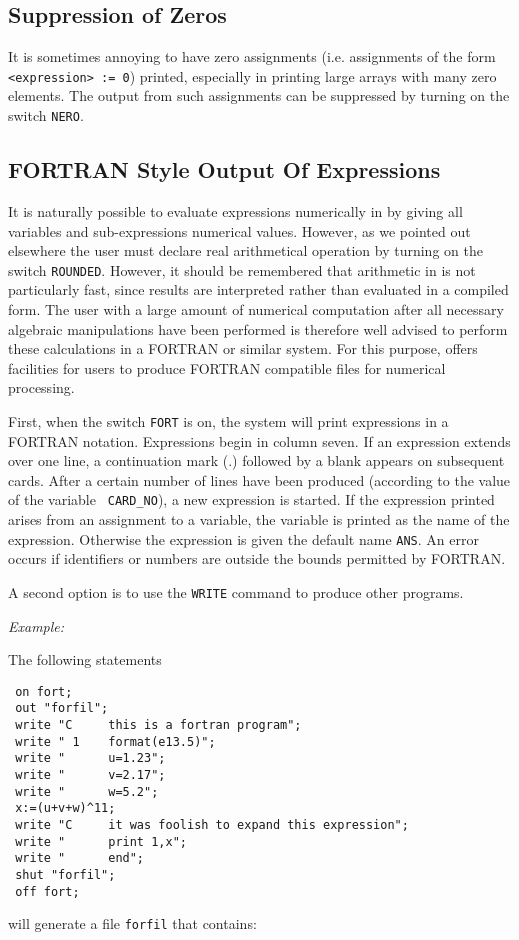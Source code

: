 \subsection{Suppression of Zeros}

It is sometimes annoying to have zero assignments (i.e. assignments of the
form {\tt <expression> := 0}) printed, especially in printing large arrays
with many zero elements.  The output from such assignments can be
suppressed by turning on the switch {\tt NERO}.

\subsection{{FORTRAN} Style Output Of Expressions}

It is naturally possible to evaluate expressions numerically in {\REDUCE} by
giving all variables and sub-expressions numerical values. However, as we
pointed out elsewhere the user must declare real arithmetical operation by
turning on the switch {\tt ROUNDED}.  However, it should be
remembered that arithmetic in {\REDUCE} is not particularly fast, since
results are interpreted rather than evaluated in a compiled form. The user
with a large amount of numerical computation after all necessary algebraic
manipulations have been performed is therefore well advised to perform
these calculations in a FORTRAN or similar system.  For
this purpose, {\REDUCE} offers facilities for users to produce FORTRAN
compatible files for numerical processing.

First, when the switch {\tt FORT} is on, the system will
print expressions in a FORTRAN notation.  Expressions begin in column
seven.  If an expression extends over one line, a continuation mark (.)
followed by a blank appears on subsequent cards.  After a certain number
of lines have been produced (according to the value of the variable {\tt
CARD\_NO}), a new expression is started.  If the
expression printed arises from an assignment to a variable, the variable
is printed as the name of the expression.  Otherwise the expression is
given the default name {\tt ANS}.  An error occurs if identifiers or
numbers are outside the bounds permitted by FORTRAN.

A second option is to use the {\tt WRITE} command to produce other programs.

{\it Example:}

The following {\REDUCE} statements
\begin{verbatim}
 on fort;
 out "forfil";
 write "C     this is a fortran program";
 write " 1    format(e13.5)";
 write "      u=1.23";
 write "      v=2.17";
 write "      w=5.2";
 x:=(u+v+w)^11;
 write "C     it was foolish to expand this expression";
 write "      print 1,x";
 write "      end";
 shut "forfil";
 off fort;
\end{verbatim}
will generate a file {\tt forfil} that contains:

